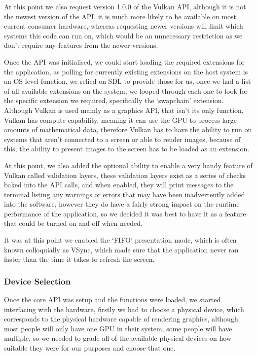\documentclass[../report.tex]{subfiles}
\begin{document}
At this point we also request version 1.0.0 of the Vulkan API, although it is not the newest version of the API, it is much more likely to be available on most current consumer hardware, whereas requesting newer versions will limit which systems this code can run on, which would be an unnecessary restriction as we don't require any features from the newer versions.

Once the API was initialised, we could start loading the required extensions for the application, as polling for currently existing extensions on the host system is an OS level function, we relied on SDL to provide those for us, once we had a list of all available extensions on the system, we looped through each one to look for the specific extension we required, specifically the `swapchain' extension.
Although Vulkan is used mainly as a graphics API, that isn't its only function, Vulkan has compute capability, meaning it can use the GPU to process large amounts of mathematical data, therefore Vulkan has to have the ability to run on systems that aren't connected to a screen or able to render images, because of this, the ability to present images to the screen has to be loaded as an extension.

At this point, we also added the optional ability to enable a very handy feature of Vulkan called validation layers, these validation layers exist as a series of checks baked into the API calls, and when enabled, they will print messages to the terminal listing any warnings or errors that may have been inadvertently added into the software, however they do have a fairly strong impact on the runtime performance of the application, so we decided it was best to have it as a feature that could be turned on and off when needed.

It was at this point we enabled the `FIFO' presentation mode, which is often known colloquially as VSync, which made sure that the application never ran faster than the time it takes to refresh the screen.

\subsubsection{Device Selection}
Once the core API was setup and the functions were loaded, we started interfacing with the hardware, firstly we had to choose a physical device, which corresponds to the physical hardware capable of rendering graphics, although most people will only have one GPU in their system, some people will have multiple, so we needed to grade all of the available physical devices on how suitable they were for our purposes and choose that one.
\end{document}
